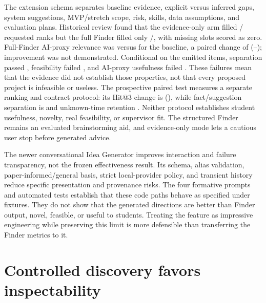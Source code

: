 The extension schema separates baseline evidence, explicit versus inferred gaps, system suggestions, MVP/stretch scope, risk, skills, data assumptions, and evaluation plans. Historical review found that the evidence-only arm filled \RecommendationEvidenceReturnedCount{}/\RecommendationRequestedSlotCount{} requested ranks but the full Finder filled only \RecommendationFullReturnedCount{}/\RecommendationRequestedSlotCount{}, with \RecommendationFullMissingCount{} missing slots scored as zero. Full-Finder AI-proxy relevance was \RecommendationFullRelevance{} versus \RecommendationEvidenceRelevance{} for the baseline, a paired change of \RecommendationRelevanceDifference{} (\RecommendationDifferenceLow{}--\RecommendationDifferenceHigh{}); improvement was not demonstrated. Conditional on the \RecommendationFullReturnedCount{} emitted items, separation passed \RecommendationSeparationPassCount{}, feasibility failed \RecommendationFeasibilityFailCount{}, and AI-proxy usefulness failed \RecommendationUsefulnessFailCount{}. These failures mean that the evidence did not establish those properties, not that every proposed project is infeasible or useless. The prospective paired test measures a separate ranking and contract protocol: its Hit@3 change is \VTwoFinderHitAtThreeDelta{} (\VTwoFinderHitAtThreeDeltaCi{}), while fact/suggestion separation is \VTwoFinderFactSuggestionSeparation{} and unknown-time retention \VTwoFinderUnknownTimeRetention{}. Neither protocol establishes student usefulness, novelty, real feasibility, or supervisor fit. The structured Finder remains an evaluated brainstorming aid, and evidence-only mode lets a cautious user stop before generated advice.

The newer conversational Idea Generator improves interaction and failure transparency, not the frozen effectiveness result. Its schema, alias validation, paper-informed/general basis, strict local-provider policy, and transient history reduce specific presentation and provenance risks. The four formative prompts and automated tests establish that these code paths behave as specified under fixtures. They do not show that the generated directions are better than Finder output, novel, feasible, or useful to students. Treating the feature as impressive engineering while preserving this limit is more defensible than transferring the Finder metrics to it.

\section{Controlled discovery favors inspectability}

